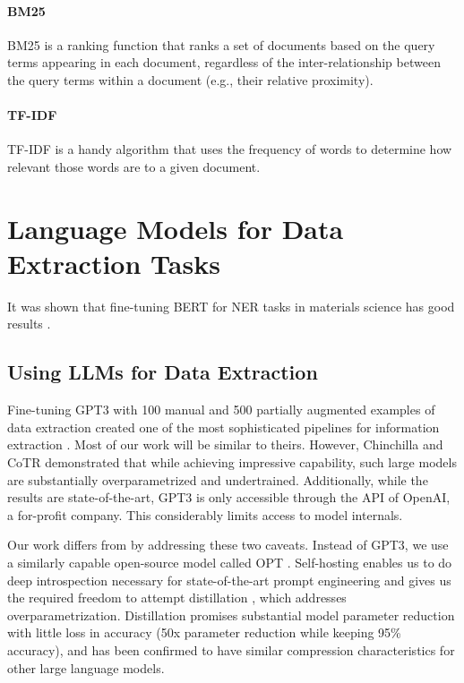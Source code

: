 \paragraph{BM25}

\gls{BM25} is a ranking function that ranks a set of documents based on the query terms appearing in each document, regardless of the inter-relationship between the query terms within a document (e.g., their relative proximity).

\paragraph{TF-IDF}
\gls{TF-IDF} is a handy algorithm that uses the frequency of words to determine how relevant those words are to a given document.

\section{Language Models for Data Extraction Tasks}
It was shown that fine-tuning \gls{BERT} for \gls{NER} tasks in materials science has good results \cite{zhao_finetuning_2021}.

\subsection{Using LLMs for Data Extraction}
Fine-tuning \gls{GPT3} with 100 manual and 500 partially augmented examples of data extraction
created one of the most sophisticated pipelines for information extraction \cite{dunn_structured_2022}.
Most of our work will be similar to theirs. However,
Chinchilla \cite{hoffmann_training_2022} and CoTR \cite{zhang_multimodal_2023}
demonstrated that while achieving impressive capability, such large models are
substantially overparametrized and undertrained. Additionally, while the
results are state-of-the-art, GPT3 is only accessible through the API of
OpenAI, a for-profit company. This considerably limits access to model
internals.

Our work differs from \cite{dunn_structured_2022} by addressing these two
caveats. Instead of GPT3, we use a similarly capable open-source model called
OPT \cite{zhang_opt_2022}. Self-hosting enables us to do deep introspection
necessary for state-of-the-art prompt engineering and gives us the required
freedom to attempt distillation \cite{sun_patient_2019}, which addresses
overparametrization. Distillation promises substantial model parameter
reduction with little loss in accuracy (50x parameter reduction while keeping
95\% accuracy), and has been confirmed to have similar compression characteristics
for other large language models.




